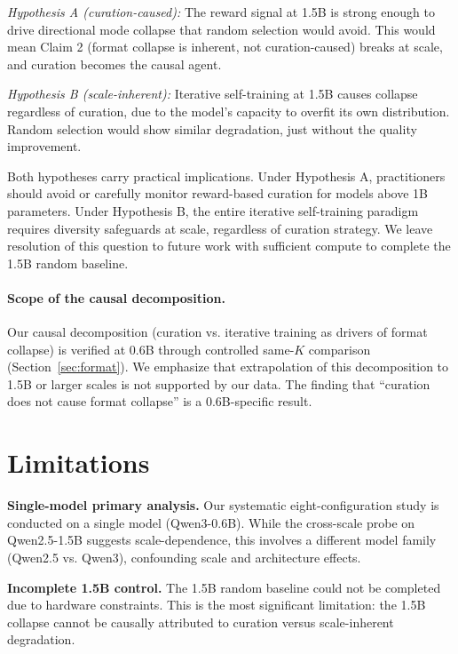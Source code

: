 \documentclass[11pt,a4paper]{article}
\begin{document}
\textit{Hypothesis A (curation-caused):} The reward signal at 1.5B is strong enough to drive directional mode collapse that random selection would avoid. This would mean Claim 2 (format collapse is inherent, not curation-caused) breaks at scale, and curation becomes the causal agent.

\textit{Hypothesis B (scale-inherent):} Iterative self-training at 1.5B causes collapse regardless of curation, due to the model's capacity to overfit its own distribution. Random selection would show similar degradation, just without the quality improvement.

Both hypotheses carry practical implications. Under Hypothesis A, practitioners should avoid or carefully monitor reward-based curation for models above 1B parameters. Under Hypothesis B, the entire iterative self-training paradigm requires diversity safeguards at scale, regardless of curation strategy. We leave resolution of this question to future work with sufficient compute to complete the 1.5B random baseline.

\paragraph{Scope of the causal decomposition.}
Our causal decomposition (curation vs. iterative training as drivers of format collapse) is verified at 0.6B through controlled same-$K$ comparison (Section~\ref{sec:format}). We emphasize that extrapolation of this decomposition to 1.5B or larger scales is not supported by our data. The finding that ``curation does not cause format collapse'' is a 0.6B-specific result.

\section{Limitations}

\textbf{Single-model primary analysis.} Our systematic eight-configuration study is conducted on a single model (Qwen3-0.6B). While the cross-scale probe on Qwen2.5-1.5B suggests scale-dependence, this involves a different model family (Qwen2.5 vs. Qwen3), confounding scale and architecture effects.

\textbf{Incomplete 1.5B control.} The 1.5B random baseline could not be completed due to hardware constraints. This is the most significant limitation: the 1.5B collapse cannot be causally attributed to curation versus scale-inherent degradation.
\end{document}
